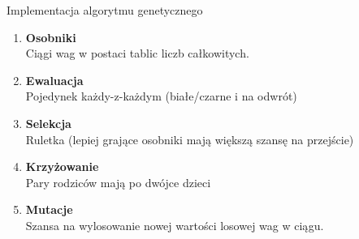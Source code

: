 \begin{frame}{Implementacja algorytmu genetycznego}
    \begin{enumerate}
        \item \textbf{Osobniki} \\
        Ciągi wag w postaci tablic liczb całkowitych.
        \item \textbf{Ewaluacja} \\
        Pojedynek każdy-z-każdym (białe/czarne i na odwrót)
        \item \textbf{Selekcja} \\
        Ruletka (lepiej grające osobniki mają większą szansę na przejście)
        \item \textbf{Krzyżowanie} \\
        Pary rodziców mają po dwójce dzieci 
        \item \textbf{Mutacje} \\
        Szansa na wylosowanie nowej wartości losowej wag w ciągu.
    \end{enumerate}
\end{frame}
